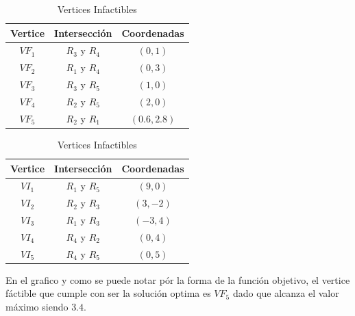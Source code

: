 \documentclass{article}
\begin{document}
\begin{flushleft}
		\begin{table}[ht]
			\centering
			\begin{minipage}{0.45\textwidth}
				\centering
				\begin{tabular}{|c|c|c|}
					\hline
					Vertice & Intersección & Coordenadas \\
					\hline
					$VF_1$ & $R_3$ y $R_4$ & $(0, 1)$ \\
					\hline
					$VF_2$ & $R_1$ y $R_4$ & $(0, 3)$\\
					\hline
					$VF_3$ & $R_3$ y $R_5$ & $(1, 0)$ \\
					\hline
					$VF_4$ & $R_2$ y $R_5$ & $(2, 0)$ \\
					\hline
					$VF_5$ & $R_2$ y $R_1$  & $(0.6, 2.8)$ \\
					\hline
				\end{tabular}
				\caption{Vertices Factibles}
				\label{tab:vertices_factibles}
			\end{minipage}
			\hfill
			\begin{minipage}{0.45\textwidth}
				\centering
				\begin{tabular}{|c|c|c|}
					\hline
					Vertice & Intersección & Coordenadas \\
					\hline
					${VI}_1$ & $R_1$ y $R_5$ & $(9, 0)$ \\
					\hline
					${VI}_2$ & $R_2$ y $R_3$ & $(3, -2)$\\
					\hline
					${VI}_3$ & $R_1$ y $R_3$  & $(-3, 4)$\\
					\hline
					${VI}_4$ & $R_4$ y $R_2$ & $(0, 4)$ \\
					\hline
					${VI}_5$ & $R_4$ y $R_5$  & $(0, 5)$ \\
					\hline
				\end{tabular}
				\caption{Vertices Infactibles}
				\label{tab:vertices_infactibles}
			\end{minipage}
		\end{table}
		\vspace{0,5cm}
		En el grafico y como se puede notar pór la forma de la función objetivo, el vertice fáctible que cumple con ser la solución optima es $VF_5$ dado que alcanza el valor máximo siendo $3.4$.\\
		

\end{flushleft}
\end{document}
